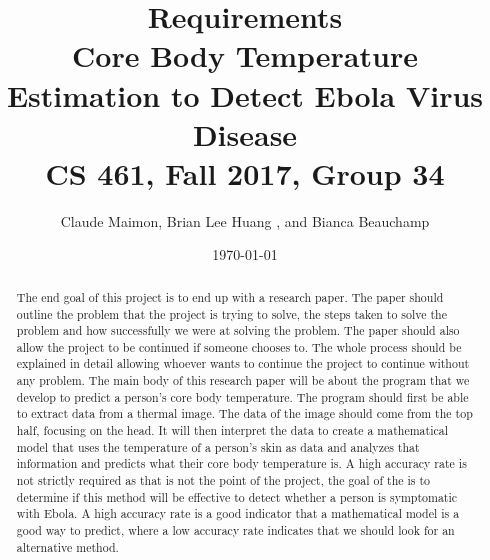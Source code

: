 \documentclass{article}
\title{%
  Requirements \\
  \vspace{0.4cm}
  \large Core Body Temperature Estimation to Detect Ebola Virus Disease \\
  \vspace{0.4cm}
  \large CS 461, Fall 2017, Group 34\\
    }
\author{Claude Maimon,  Brian Lee Huang , and Bianca Beauchamp}
\date{\today}
\begin{document}
\maketitle


\begin{abstract}
	The end goal of this project is to end up with a research paper. The paper should outline the problem that the project is trying to solve, the steps taken to solve the problem and how successfully we were
	at solving the problem. The paper should also allow the project to be continued if someone chooses to. The whole process should be explained in detail allowing whoever wants to continue the
	project to continue without any problem. The main body of this research paper will be about the program that we develop to predict a person's core body temperature. The program should first be able to
	extract data from a thermal image. The data of the image should come from the top half, focusing on the head. It will then interpret the data to create a mathematical model that uses the temperature of a 
	person's skin as data and analyzes that information and predicts what their core body temperature is. A high accuracy rate is not strictly required as that is not the point of the project, 
	the goal of the is to determine if this method will be effective to detect whether a person is symptomatic with Ebola. A high accuracy rate is a good indicator that a mathematical model
	is a good way to predict, where a low accuracy rate indicates that we should look for an alternative method.
	
\end{abstract}

\newpage
\end{document}
